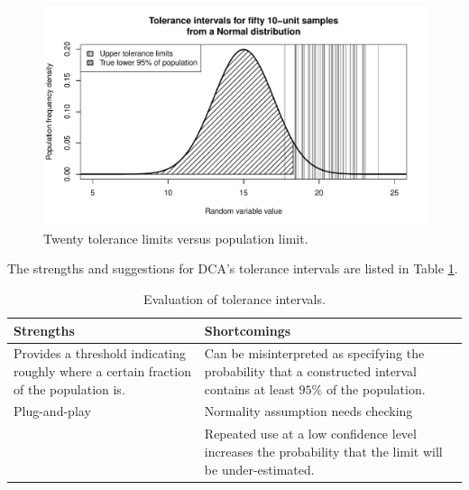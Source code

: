 \documentclass[11pt,a4paper,article]{memoir} %
\begin{document}
\begin{figure}[H]
\includegraphics[width=\textwidth]{tolerance_intervals.pdf}
\caption{Twenty tolerance limits versus population limit.}
\label{fig:tolerance_intervals}
\end{figure}
The strengths and suggestions for DCA's tolerance intervals are listed in Table \ref{tab:tol_intervals}.
\begin{table}[b]
\caption{Evaluation of tolerance intervals.}
\small
\hspace*{-.5cm}
\begin{tabular}{p{6.5cm}p{6.5cm}}
\toprule
\textbf{Strengths}	&	\textbf{Shortcomings} \\
\toprule
Provides a threshold indicating roughly where a certain fraction of the population is. & Can be misinterpreted as specifying the probability that a constructed interval contains at least $95\%$ of the population. \\
Plug-and-play & Normality assumption needs checking \\
 & Repeated use at a low confidence level increases the probability that the limit will be under-estimated. \\
\bottomrule
\end{tabular}
\label{tab:tol_intervals}
\end{table}

\newpage
\end{document}
